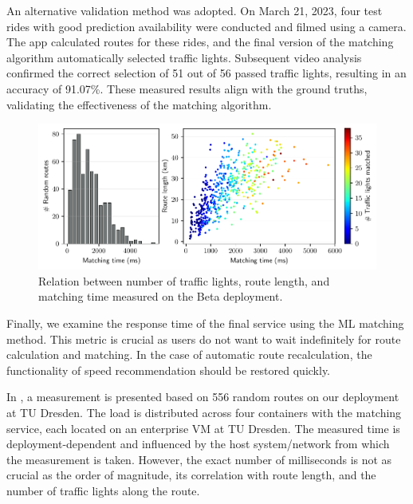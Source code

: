 An alternative validation method was adopted. On March 21, 2023, four test rides with good prediction availability were conducted and filmed using a camera. The app calculated routes for these rides, and the final version of the matching algorithm automatically selected traffic lights. Subsequent video analysis confirmed the correct selection of 51 out of 56 passed traffic lights, resulting in an accuracy of 91.07\%. These measured results align with the ground truths, validating the effectiveness of the matching algorithm.

\begin{figure}[t]
\centering 
\includegraphics[width=\linewidth]{images/matching-performance-556-routes.pdf}
\caption{Relation between number of traffic lights, route length, and matching time measured on the Beta deployment.}
\label{fig:matching-performance}
\end{figure}

Finally, we examine the response time of the final service using the ML matching method. This metric is crucial as users do not want to wait indefinitely for route calculation and matching. In the case of automatic route recalculation, the functionality of speed recommendation should be restored quickly.

In , a measurement is presented based on 556 random routes on our deployment at TU Dresden. The load is distributed across four containers with the matching service, each located on an enterprise VM at TU Dresden. The measured time is deployment-dependent and influenced by the host system/network from which the measurement is taken. However, the exact number of milliseconds is not as crucial as the order of magnitude, its correlation with route length, and the number of traffic lights along the route.

